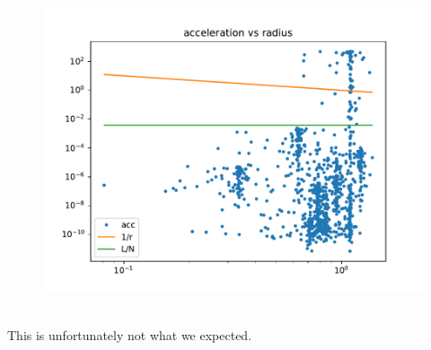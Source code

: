         \newpage
        \begin{figure}[h!]
            \centering
            \includegraphics[width=\textwidth]{../figures/acc2.pdf}
        \end{figure} \ \\ 
        This is unfortunately not what we expected. 
